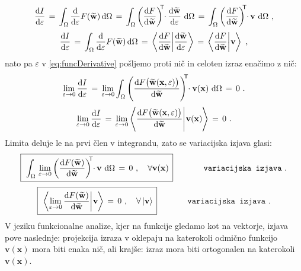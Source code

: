 \begin{equation*}
	\frac{\mathrm{d} I}{\mathrm{d} \varepsilon} \,
	=
	\, \int_{\Omega} \frac{\mathrm{d}}{\mathrm{d} \varepsilon} F(\widetilde{\mathbf{w}}) \, \mathrm{d} \Omega \,
	=
	\, \int_{\Omega} \left(\frac{\mathrm{d} F}{\mathrm{d} \widetilde{\mathbf{w}}}\right)^\mathsf{\mkern-7mu T} \mkern-5mu \cdot \mkern-1mu \frac{\mathrm{d} \widetilde{\mathbf{w}}}{\mathrm{d} \varepsilon} \ \mathrm{d} \Omega \,
	=
	\, \int_{\Omega} \left(\frac{\mathrm{d} F}{\mathrm{d} \widetilde{\mathbf{w}}}\right)^\mathsf{\mkern-7mu T} \mkern-5mu \cdot \mkern-1mu \mathbf{v} \ \mathrm{d} \Omega \ ,
\end{equation*}
\begin{equation}
	\frac{\mathrm{d} I}{\mathrm{d} \varepsilon} \,
	=
	\, \int_{\Omega} \frac{\mathrm{d}}{\mathrm{d} \varepsilon} F(\widetilde{\mathbf{w}}) \, \mathrm{d} \Omega \,
	=
	\, \bra{\frac{\mathrm{d} F}{\mathrm{d} \widetilde{\mathbf{w}}}}\ket{\frac{\mathrm{d} \widetilde{\mathbf{w}}}{\mathrm{d} \varepsilon}} \,
	=
	\, \bra{\frac{\mathrm{d} F}{\mathrm{d} \widetilde{\mathbf{w}}}}\ket{\mkern1mu \mathbf{v} \mkern-1mu} \ ,
\label{eq:funcDerivative}
\end{equation}
nato pa $\varepsilon$ v \eqref{eq:funcDerivative} pošljemo proti nič in celoten izraz enačimo z nič:
\begin{equation*}
	\lim_{\varepsilon \rightarrow 0} \frac{\mathrm{d} I}{\mathrm{d} \varepsilon} \,
	=
	\, \lim_{\varepsilon \rightarrow 0} \int_{\Omega} \left(\frac{\mathrm{d} F\big(\widetilde{\mathbf{w}}(\mathbf{x}, \varepsilon)\big)}{\mathrm{d} \widetilde{\mathbf{w}}}\right)^\mathsf{\mkern-7mu T} \mkern-5mu \cdot \mathbf{v(\mathbf{x})} \ \mathrm{d} \Omega \,
	=
	\, 0 \ .
\end{equation*}
\begin{equation*}
	\lim_{\varepsilon \rightarrow 0} \frac{\mathrm{d} I}{\mathrm{d} \varepsilon} \,
	=
	\, \lim_{\varepsilon \rightarrow 0} \bra{\frac{\mathrm{d} F\big(\widetilde{\mathbf{w}}(\mathbf{x}, \varepsilon)\big)}{\mathrm{d} \widetilde{\mathbf{w}}}}\ket{\mkern1mu \mathbf{v(\mathbf{x})} \mkern-1mu} \,
	=
	\, 0 \ .
\end{equation*}
Limita deluje le na prvi člen v integrandu, zato se variacijska izjava glasi:
\begin{equation}
	\boxed{\, \vphantom{\bigg)^2_3}
		\int_{\Omega} \, \lim_{\varepsilon \rightarrow 0} \left(\frac{\ud F(\widetilde{\mathbf{w}})}{\ud \widetilde{\mathbf{w}}} \right)^\mathsf{\mkern-7mu T} \mkern-5mu \cdot \mkern-1mu \mathbf{v} \ \ud \Omega \, = \, 0 \ , \quad \forall \mathbf{v(\mathbf{x})}\,
	}
	\hspace{1.3cm} \texttt{variacijska izjava} \ .
	\label{eq:variationalStatement1}
\end{equation}
\begin{equation}
	\boxed{\, \vphantom{\bigg)^2_3}
		\bra{\lim_{\varepsilon \rightarrow 0} \frac{\mathrm{d} F(\widetilde{\mathbf{w}})}{\mathrm{d} \widetilde{\mathbf{w}}}}\ket{\mkern1mu \mathbf{v} \mkern-1mu} \, = \, 0 \ , \quad \forall \ket{\mathbf{v}}\,
	}
	\hspace{1.3cm} \texttt{variacijska izjava} \ .
	\label{eq:variationalStatement}
\end{equation}
V jeziku funkcionalne analize, kjer na funkcije gledamo kot na vektorje, izjava pove naslednje: projekcija izraza v oklepaju na katerokoli odmično funkcijo $\mathbf{v(x)}$ mora biti enaka nič, ali krajše: izraz mora biti ortogonalen na katerokoli $\mathbf{v(x)}$.

